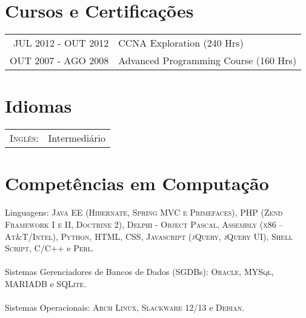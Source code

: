 \documentclass[a4paper,10pt]{article} %
\begin{document}

\section{Cursos e Certificações}

\begin{tabular}{rl}
  \textsc{JUL} 2012 - \textsc{OUT} 2012 & CCNA Exploration \footnotesize(240 Hrs)\normalsize\\
  \textsc{OUT} 2007 - \textsc{AGO} 2008 & Advanced Programming Course \footnotesize(160 Hrs)\normalsize\\

\end{tabular}


\section{Idiomas}

\begin{tabular}{rl}
\textsc{Inglês:} & Intermediário\\
\end{tabular}


\section{Competências em Computação}

  Linguagens:  \textsc{Java EE (Hibernate, Spring MVC e Primefaces)}, \textsc{PHP (Zend Framework I e II, Doctrine 2)}, \textsc{Delphi - Object Pascal}, \textsc{Assembly (x86 -- At\&T/Intel)}, \textsc{Python}, \textsc{HTML}, \textsc{CSS}, \textsc{Javascript (jQuery, jQuery UI)}, \textsc{Shell Script}, \textsc{C/C++} e \textsc{Perl}. 
\\
\\
  Sistemas Gerenciadores de Bancos de Dados (SGDBs):  \textsc{Oracle}, \textsc{MYSql}, \textsc{MARIADB} e \textsc{SQLite}. 
\\
\\
  Sistemas Operacionais: \textsc{Arch Linux}, \textsc{Slackware 12/13} e \textsc{Debian}.
\end{document}
